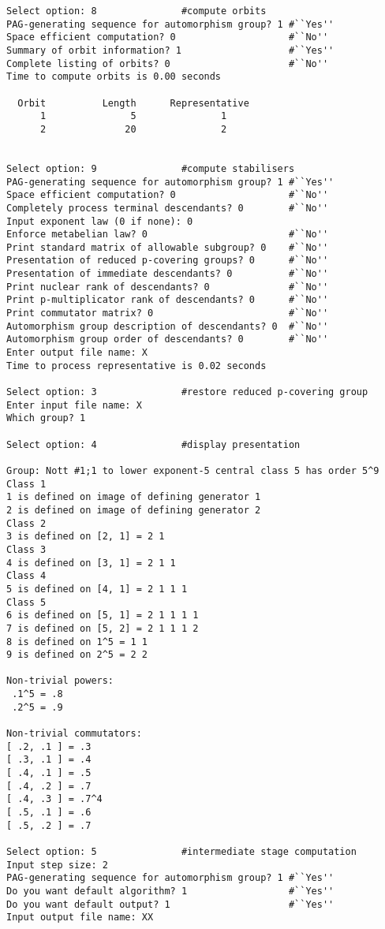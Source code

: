 \documentclass[12pt]{article}
\begin{document}
\begin{verbatim}
Select option: 8               #compute orbits 
PAG-generating sequence for automorphism group? 1 #``Yes''
Space efficient computation? 0                    #``No''
Summary of orbit information? 1                   #``Yes''
Complete listing of orbits? 0                     #``No''
Time to compute orbits is 0.00 seconds

  Orbit          Length      Representative
      1               5               1
      2              20               2


Select option: 9               #compute stabilisers 
PAG-generating sequence for automorphism group? 1 #``Yes''
Space efficient computation? 0                    #``No''
Completely process terminal descendants? 0        #``No''
Input exponent law (0 if none): 0
Enforce metabelian law? 0                         #``No''
Print standard matrix of allowable subgroup? 0    #``No''
Presentation of reduced p-covering groups? 0      #``No''
Presentation of immediate descendants? 0          #``No''
Print nuclear rank of descendants? 0              #``No''
Print p-multiplicator rank of descendants? 0      #``No''
Print commutator matrix? 0                        #``No''
Automorphism group description of descendants? 0  #``No''
Automorphism group order of descendants? 0        #``No''
Enter output file name: X
Time to process representative is 0.02 seconds

Select option: 3               #restore reduced p-covering group 
Enter input file name: X
Which group? 1

Select option: 4               #display presentation

Group: Nott #1;1 to lower exponent-5 central class 5 has order 5^9
Class 1
1 is defined on image of defining generator 1
2 is defined on image of defining generator 2
Class 2
3 is defined on [2, 1] = 2 1 
Class 3
4 is defined on [3, 1] = 2 1 1 
Class 4
5 is defined on [4, 1] = 2 1 1 1 
Class 5
6 is defined on [5, 1] = 2 1 1 1 1 
7 is defined on [5, 2] = 2 1 1 1 2 
8 is defined on 1^5 = 1 1 
9 is defined on 2^5 = 2 2 

Non-trivial powers:
 .1^5 = .8
 .2^5 = .9

Non-trivial commutators:
[ .2, .1 ] = .3
[ .3, .1 ] = .4
[ .4, .1 ] = .5
[ .4, .2 ] = .7
[ .4, .3 ] = .7^4
[ .5, .1 ] = .6
[ .5, .2 ] = .7

Select option: 5               #intermediate stage computation
Input step size: 2
PAG-generating sequence for automorphism group? 1 #``Yes''
Do you want default algorithm? 1                  #``Yes''
Do you want default output? 1                     #``Yes''
Input output file name: XX


\end{verbatim}
\end{document}
